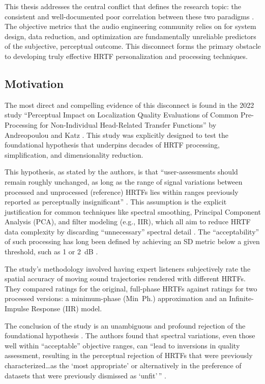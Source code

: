 \documentclass[12pt,a4paper]{article}
\begin{document}
This thesis addresses the central conflict that defines the research topic: the consistent and well-documented poor correlation between these two paradigms \cite{zhang2025}. The objective metrics that the audio engineering community relies on for system design, data reduction, and optimization are fundamentally unreliable predictors of the subjective, perceptual outcome. This disconnect forms the primary obstacle to developing truly effective HRTF personalization and processing techniques.

\subsection{Motivation}

The most direct and compelling evidence of this disconnect is found in the 2022 study ``Perceptual Impact on Localization Quality Evaluations of Common Pre-Processing for Non-Individual Head-Related Transfer Functions'' by Andreopoulou and Katz \cite{andreopoulou2022}. This study was explicitly designed to test the foundational hypothesis that underpins decades of HRTF processing, simplification, and dimensionality reduction.

This hypothesis, as stated by the authors, is that ``user-assessments should remain roughly unchanged, as long as the range of signal variations between processed and unprocessed (reference) HRTFs lies within ranges previously reported as perceptually insignificant'' \cite{andreopoulou2022}. This assumption is the explicit justification for common techniques like spectral smoothing, Principal Component Analysis (PCA), and filter modeling (e.g., IIR), which all aim to reduce HRTF data complexity by discarding ``unnecessary'' spectral detail \cite{andreopoulou2022}. The ``acceptability'' of such processing has long been defined by achieving an SD metric below a given threshold, such as 1 or 2~dB \cite{andreopoulou2022}.

The study's methodology involved having expert listeners subjectively rate the spatial accuracy of moving sound trajectories rendered with different HRTFs. They compared ratings for the original, full-phase HRTFs against ratings for two processed versions: a minimum-phase (Min~Ph.) approximation and an Infinite-Impulse Response (IIR) model.

The conclusion of the study is an unambiguous and profound rejection of the foundational hypothesis \cite{andreopoulou2022}. The authors found that spectral variations, even those well within ``acceptable'' objective ranges, can ``lead to inversions in quality assessment, resulting in the perceptual rejection of HRTFs that were previously characterized\ldots as the `most appropriate' or alternatively in the preference of datasets that were previously dismissed as `unfit'\,'' \cite{andreopoulou2022}.
\end{document}
